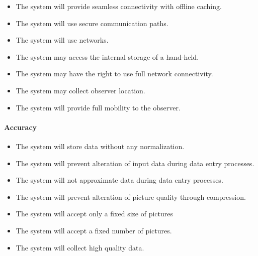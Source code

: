 \begin{itemize}
        \item The system will provide seamless connectivity with offline caching.
        \item The system will use secure communication paths.
        \item The system will use networks.
        \item The system may access the internal storage of a hand-held.
        \item The system may have the right to use full network connectivity.
        \item The system may collect observer location.
        \item The system will provide full mobility to the observer.

	\end{itemize}
    \paragraph{Accuracy}
        \begin{itemize}
            \item The system will store data without any normalization.
            \item The system will prevent alteration of input data during data entry processes.
            \item The system will not approximate data during data entry processes.
            \item The system will prevent alteration of picture quality through compression.
            \item The system will accept only a fixed size of pictures
            \item The system will accept a fixed number of pictures.
            \item The system will collect high quality data.

        \end{itemize}

